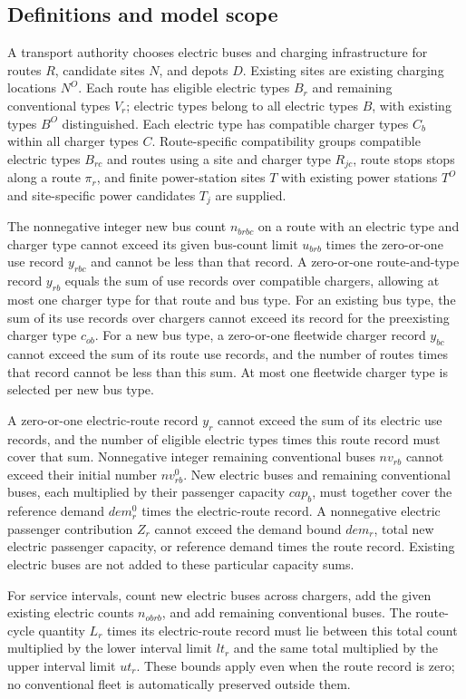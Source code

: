 \documentclass[10pt]{article}
\begin{document}
\subsection*{Definitions and model scope}
A transport authority chooses electric buses and charging infrastructure for routes $R$, candidate sites $N$, and depots $D$. Existing sites are existing charging locations $N^O$. Each route has eligible electric types $B_r$ and remaining conventional types $V_r$; electric types belong to all electric types $B$, with existing types $B^O$ distinguished. Each electric type has compatible charger types $C_b$ within all charger types $C$. Route-specific compatibility groups compatible electric types $B_{rc}$ and routes using a site and charger type $R_{jc}$, route stops stops along a route $\pi_r$, and finite power-station sites $T$ with existing power stations $T^O$ and site-specific power candidates $T_j$ are supplied.

The nonnegative integer new bus count $n_{brbc}$ on a route with an electric type and charger type cannot exceed its given bus-count limit $u_{brb}$ times the zero-or-one use record $y_{rbc}$ and cannot be less than that record. A zero-or-one route-and-type record $y_{rb}$ equals the sum of use records over compatible chargers, allowing at most one charger type for that route and bus type. For an existing bus type, the sum of its use records over chargers cannot exceed its record for the preexisting charger type $c_{ob}$. For a new bus type, a zero-or-one fleetwide charger record $y_{bc}$ cannot exceed the sum of its route use records, and the number of routes times that record cannot be less than this sum. At most one fleetwide charger type is selected per new bus type.

A zero-or-one electric-route record $y_r$ cannot exceed the sum of its electric use records, and the number of eligible electric types times this route record must cover that sum. Nonnegative integer remaining conventional buses $nv_{rb}$ cannot exceed their initial number $nv^0_{rb}$. New electric buses and remaining conventional buses, each multiplied by their passenger capacity $cap_b$, must together cover the reference demand $dem_r^0$ times the electric-route record. A nonnegative electric passenger contribution $Z_r$ cannot exceed the demand bound $dem_r$, total new electric passenger capacity, or reference demand times the route record. Existing electric buses are not added to these particular capacity sums.

For service intervals, count new electric buses across chargers, add the given existing electric counts $n_{obrb}$, and add remaining conventional buses. The route-cycle quantity $L_r$ times its electric-route record must lie between this total count multiplied by the lower interval limit $lt_r$ and the same total multiplied by the upper interval limit $ut_r$. These bounds apply even when the route record is zero; no conventional fleet is automatically preserved outside them.
\end{document}
